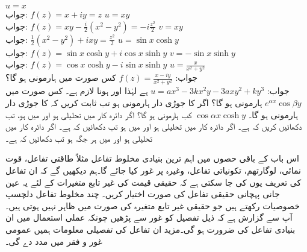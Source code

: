 \quad
$u=x$\\
جواب:\quad
$f(z)=x+iy=z$
\quad
$u=xy$\\
جواب:\quad
$f(z)=xy-\tfrac{i}{2}(x^2-y^2)=-i\frac{z^2}{2}$
\quad
$v=xy$\\
جواب:\quad
$\tfrac{1}{2}(x^2-y^2)+ixy=\tfrac{z^2}{2}$
\quad
$u=\sin x\cosh y$\\
جواب:\quad
$f(z)=\sin x\cosh y+i\cos x\sinh y$
\quad
$v=-\sin x\sinh y$\\
جواب:\quad
$f(z)=\cos x\cosh y-i\sin x\sinh y$
\quad
$u=\frac{x}{x^2+y^2}$\\
جواب:\quad
$f(z)=\frac{x-iy}{x^2+y^2}$
\quad
کس صورت میں   ہارمونی ہو گا؟\\
جواب:\quad
$u=ax^3-3kx^2y-3axy^2+ky^3$ 
ہے لہٰذا  اور  ہونا لازم ہے۔
\quad
کس صورت میں 
$e^{\alpha x}\cos \beta y$
 ہارمونی ہو گا؟
\quad
اگر  کا جوڑی دار ہارمونی  ہو تب ثابت کریں کہ  کا جوڑی دار ہارمونی  ہو گا۔
\quad
$\cos \alpha x\cosh y$
کب ہارمونی ہو گا؟
\quad
اگر دائرہ کار  میں  تحلیلی ہو اور  میں  ہو، تب دکھائیں کریں کہ  ہے۔
\quad
اگر دائرہ کار  میں  تحلیلی ہو اور  میں  ہو تب دکھائیں کہ  ہے۔
\quad
اگر دائرہ کار  میں  تحلیلی ہو اور  میں ہر جگہ  ہو تب دکھائیں کہ  ہے۔

اس  باب کے باقی حصوں میں اہم ترین بنیادی مخلوط تفاعل مثلاً طاقتی تفاعل، قوت نمائی، لوگارتھم، تکونیاتی تفاعل، وغیرہ پر غور کیا جائے گا۔ہم دیکھیں گے کہ ان تفاعل کی تعریف یوں کی جا سکتی ہے کہ حقیقی قیمت کی غیر تابع متغیرات کے لئے یہ عین جانی پہچانی حقیقی تفاعل کی صورت اختیار کریں۔ چند مخلوط تفاعل دلچسپ خصوصیات  رکھتے ہیں جو حقیقی غیر تابع متغیرہ کی صورت میں
  ظاہر نہیں ہوتی ہیں۔آپ سے گزارش ہے کہ ذیل تفصیل کو غور سے پڑھیں چونکہ عملی استعمال میں ان بنیادی تفاعل کی ضرورت ہو گی۔مزید ان تفاعل کی تفصیلی معلومات ہمیں عمومی غور و فقر میں مدد دے گی۔

